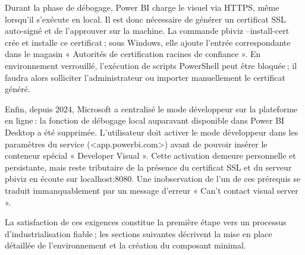 Durant la phase de débogage, Power BI charge le visuel via HTTPS, même lorsqu’il s’exécute en local. Il est donc nécessaire de générer un certificat SSL auto-signé et de l’approuver sur la machine. La commande pbiviz --install-cert crée et installe ce certificat ; sous Windows, elle ajoute l’entrée correspondante dans le magasin « Autorités de certification racines de confiance ». En environnement verrouillé, l’exécution de scripts PowerShell peut être bloquée ; il faudra alors solliciter l’administrateur ou importer manuellement le certificat généré.

Enfin, depuis 2024, Microsoft a centralisé le mode développeur sur la plateforme en ligne : la fonction de débogage local auparavant disponible dans Power BI Desktop a été supprimée. L’utilisateur doit activer le mode développeur dans les paramètres du service (<app.powerbi.com>) avant de pouvoir insérer le conteneur spécial « Developer Visual ». Cette activation demeure personnelle et persistante, mais reste tributaire de la présence du certificat SSL et du serveur pbiviz en écoute sur localhost:8080. Une inobservation de l’un de ces prérequis se traduit immanquablement par un message d’erreur « Can’t contact visual server ».

La satisfaction de ces exigences constitue la première étape vers un processus d’industrialisation fiable ; les sections suivantes décrivent la mise en place détaillée de l’environnement et la création du composant minimal.
